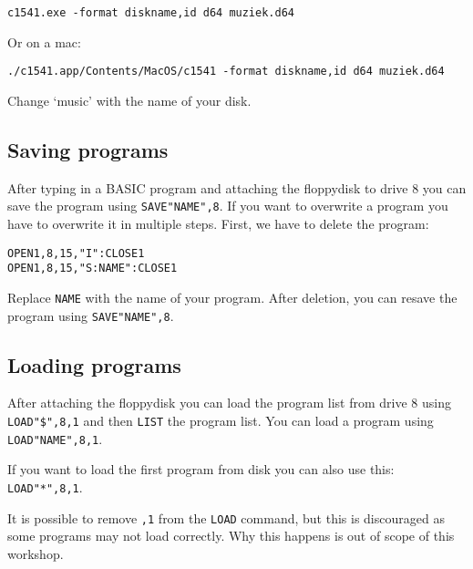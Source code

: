 \begin{lstlisting}
c1541.exe -format diskname,id d64 muziek.d64
\end{lstlisting}

Or on a mac:

\begin{lstlisting}
./c1541.app/Contents/MacOS/c1541 -format diskname,id d64 muziek.d64
\end{lstlisting}

Change `music' with the name of your disk.

\subsection{Saving programs}

After typing in a BASIC program and attaching the floppydisk to drive 8 you can save the program using \verb:SAVE"NAME",8:.
If you want to overwrite a program you have to overwrite it in multiple steps.
First, we have to delete the program:

\begin{lstlisting}
OPEN1,8,15,"I":CLOSE1
OPEN1,8,15,"S:NAME":CLOSE1
\end{lstlisting}

Replace \verb:NAME: with the name of your program.
After deletion, you can resave the program using \verb:SAVE"NAME",8:.

\subsection{Loading programs}

After attaching the floppydisk you can load the program list from drive 8 using \verb:LOAD"$",8,1: and then \verb:LIST: the program list.
You can load a program using \verb:LOAD"NAME",8,1:.

If you want to load the first program from disk you can also use this: \verb:LOAD"*",8,1:.

It is possible to remove \verb:,1: from the \verb:LOAD: command, but this is discouraged as some programs may not load correctly.
Why this happens is out of scope of this workshop.
